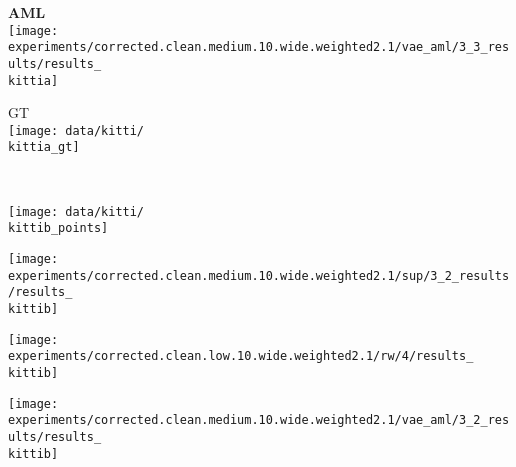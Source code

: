 {\begin{minipage}[t]{0.145\textwidth}
    \hspace*{2mm}
	{\bf\color{MPIIorange} AML}\\[-1px]
	\texttt{[image: experiments/corrected.clean.medium.10.wide.weighted2.1/vae\_aml/3\_3\_results/results\_\\kittia]}
\end{minipage}
\begin{minipage}[t]{0.145\textwidth}
	\vspace{0px}\centering
    \hspace*{2mm}
	GT\\[-1px]
	\texttt{[image: data/kitti/\\kittia\_gt]}
\end{minipage}
\\[-4px]
\begin{minipage}[t]{0.03\textwidth}
    \vspace{0px}\centering
    \vspace{5mm}
\end{minipage}
\begin{minipage}[t]{0.145\textwidth}
	\vspace{0px}\centering
	\texttt{[image: data/kitti/\\kittib\_points]}
\end{minipage}
\begin{minipage}[t]{0.145\textwidth}
	\vspace{0px}\centering
	\texttt{[image: experiments/corrected.clean.medium.10.wide.weighted2.1/sup/3\_2\_results/results\_\\kittib]}
\end{minipage}
\begin{minipage}[t]{0.145\textwidth}
	\vspace{0px}\centering
	\texttt{[image: experiments/corrected.clean.low.10.wide.weighted2.1/rw/4/results\_\\kittib]}
\end{minipage}
\begin{minipage}[t]{0.145\textwidth}
	\vspace{0px}\centering
	\texttt{[image: experiments/corrected.clean.medium.10.wide.weighted2.1/vae\_aml/3\_2\_results/results\_\\kittib]}

\end{minipage}}
